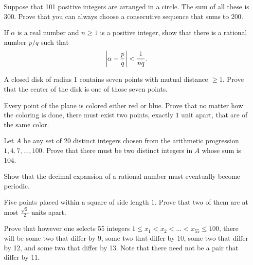 \documentclass[12pt]{article}
\begin{document}
        \begin{exercise}
            Suppose that 101 positive integers are arranged in a circle.
            The sum of all these is 300.
            Prove that you can always choose a consecutive sequence that sums to 200.
        \end{exercise}

        \begin{exercise}
            If \(\alpha\) is a real number and \(n\geq 1\) is a positive integer, show that there is a rational number \(p/q\) such that
            \[\left\lvert \alpha-\frac{p}{q} \right\rvert<\frac{1}{nq}.\]
        \end{exercise}

        \begin{exercise}
            A closed disk of radius 1 contains seven points with mutual distance \(\geq 1\).
            Prove that the center of the disk is one of those seven points.
        \end{exercise}
            
        \begin{exercise}
            Every point of the plane is colored either red or blue. Prove that no matter how the coloring is done, there must exist two points, exactly $1$ unit apart, that are of the same color.
        \end{exercise}
            
        \begin{exercise}
            Let $A$ be any set of $20$ distinct integers chosen from the arithmetic progression $1,4,7,\dots, 100$. Prove that there must be two distinct integers in $A$ whose sum is $104$.
        \end{exercise}

        \begin{exercise}
            Show that the decimal expansion of a rational number must eventually become periodic.
        \end{exercise}
            
        \begin{exercise}
             Five points placed within a square of side length $1$. Prove that two of them are at most $\frac{\sqrt{2}}{2}$  units apart.
        \end{exercise}

        \begin{exercise}
            Prove that however one selects 55 integers \(1\leq x_1 < x_2 < \ldots < x_{55} \leq 100\), there will be some two that differ by 9, some two that differ by 10, some two that differ by 12, and some two that differ by 13.
            Note that there need not be a pair that differ by 11.
        \end{exercise}
\end{document}
